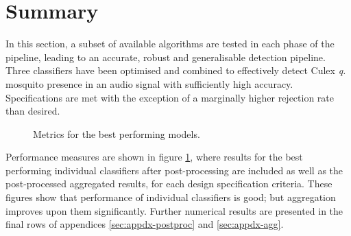 \section{Summary}
\label{sec:exp-summary}
    In this section, a subset of available algorithms are tested in each phase of the pipeline, leading to an accurate, robust and generalisable detection pipeline. Three classifiers have been optimised and combined to effectively detect Culex \textit{q.} mosquito presence in an audio signal with sufficiently high accuracy. Specifications are met with the exception of a marginally higher rejection rate than desired. 
    \begin{figure}[ht]
        \scriptsize
        \singlespacing
        \centering
        \qquad
        \caption{Metrics for the best performing models.}
        \label{fig:exp-summary-metrics}
        
    \end{figure}
    Performance measures are shown in figure \ref{fig:exp-summary-metrics}, where results for the best performing individual classifiers after post-processing are included as well as the post-processed aggregated results, for each design specification criteria. These figures show that performance of individual classifiers is good; but aggregation improves upon them significantly. Further numerical results are presented in the final rows of appendices \ref{sec:appdx-postproc} and \ref{sec:appdx-agg}.
    
    
    
    